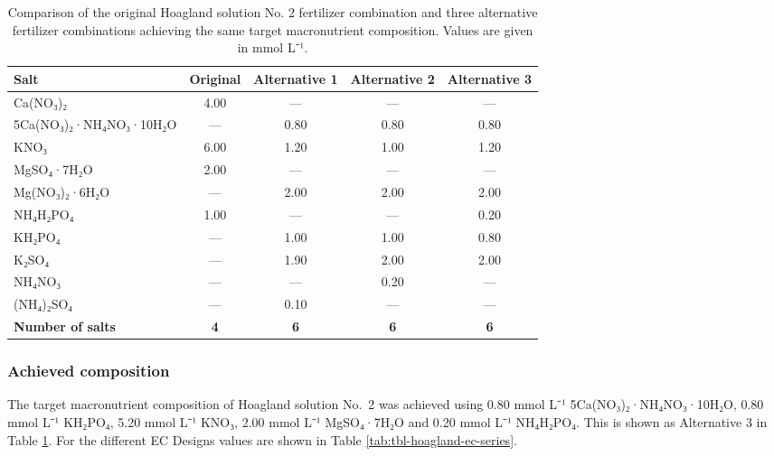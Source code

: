 \documentclass[
  letterpaper,
  DIV=11,
  numbers=noendperiod]{scrreprt}
\begin{document}
\begin{table}[H]
\centering
\caption{\label{tab:tbl-hoagland-comparison}Comparison of the original Hoagland solution No. 2 fertilizer combination and three alternative fertilizer combinations achieving the same target macronutrient composition. Values are given in mmol L⁻¹.}
\centering
\begin{tabular}[t]{lcccc}
\toprule
Salt & Original & Alternative 1 & Alternative 2 & Alternative 3\\
\midrule
Ca(NO₃)₂ & 4.00 & — & — & —\\
5Ca(NO₃)₂·NH₄NO₃·10H₂O & — & 0.80 & 0.80 & 0.80\\
KNO₃ & 6.00 & 1.20 & 1.00 & 1.20\\
MgSO₄·7H₂O & 2.00 & — & — & —\\
Mg(NO₃)₂·6H₂O & — & 2.00 & 2.00 & 2.00\\
\addlinespace
NH₄H₂PO₄ & 1.00 & — & — & 0.20\\
KH₂PO₄ & — & 1.00 & 1.00 & 0.80\\
K₂SO₄ & — & 1.90 & 2.00 & 2.00\\
NH₄NO₃ & — & — & 0.20 & —\\
(NH₄)₂SO₄ & — & 0.10 & — & —\\
\addlinespace
\textbf{Number of salts} & \textbf{4} & \textbf{6} & \textbf{6} & \textbf{6}\\
\bottomrule
\end{tabular}
\end{table}

\vspace{1.5\baselineskip}

\subsubsection{Achieved composition}\label{achieved-composition}

The target macronutrient composition of Hoagland solution No.~2 was
achieved using 0.80 mmol L⁻¹ 5Ca(NO₃)₂·NH₄NO₃·10H₂O, 0.80 mmol L⁻¹
KH₂PO₄, 5.20 mmol L⁻¹ KNO₃, 2.00 mmol L⁻¹ MgSO₄·7H₂O and 0.20 mmol L⁻¹
NH₄H₂PO₄. This is shown as Alternative 3 in Table
\ref{tab:tbl-hoagland-comparison}. For the different EC Designs values
are shown in Table \ref{tab:tbl-hoagland-ec-series}.
\end{document}
